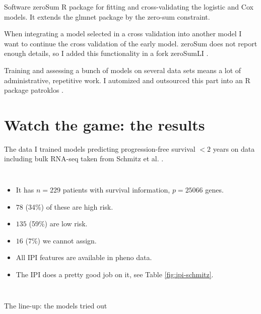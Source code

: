 \documentclass[10pt, aspectratio=169]{beamer}
\begin{document}
\begin{frame}{Software}
  \alert{zeroSum R package} \autocite{zerosumR} for fitting and cross-validating the logistic and Cox models. 
  It extends the glmnet package by the zero-sum constraint.

  When integrating a model selected in a cross validation into another model I want to continue the cross 
  validation of the early model. zeroSum does not report enough details, so I added this functionality in 
  a \alert{fork zeroSumLI} \autocite{zerosumliR}.

  Training and assessing a bunch of models on several data sets means a lot of administrative, repetitive 
  work. I automized and outsourced this part into an \alert{R package patroklos} \autocite{patroklos}.
\end{frame}

\section{Watch the game: the results}

\begin{frame}{The data}
  I trained models predicting progression-free survival $< 2$ years on data including bulk RNA-seq 
  taken from Schmitz et al. \autocite{schmitz18}. 
  \begin{columns}
      \begin{itemize}
        \item It has $n = \num{229}$ patients with survival information, $p = \num{25066}$ genes.
        \item $\num{78}$ (34\%) of these are high risk.
        \item $\num{135}$ (59\%) are low risk. 
        \item $\num{16}$ (7\%) we cannot assign.
        \item All IPI features are available in pheno data.
        \item The IPI does a pretty good job on it, see Table \ref{fig:ipi-schmitz}.
      \end{itemize}
      
  \end{columns}
\end{frame}

\begin{frame}{The line-up: the models tried out}
  
\end{frame}
\end{document}
